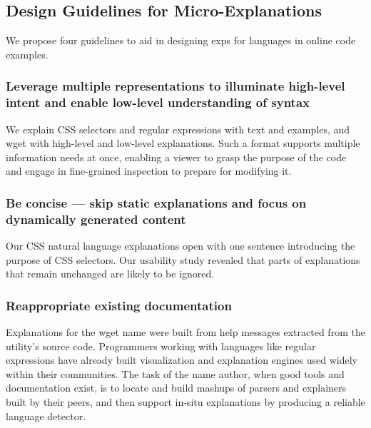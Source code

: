 \begin{changes}
\subsection{Design Guidelines for Micro-Explanations}
We propose four guidelines to aid in designing \glspl{exp} for languages in online code examples.

\subsubsection{Leverage multiple representations to illuminate high-level intent and enable low-level understanding of syntax}
We explain CSS selectors and regular expressions with text and examples, and wget with high-level and low-level explanations.
Such a format supports multiple information needs at once, enabling a viewer to grasp the purpose of the code and engage in fine-grained inspection to prepare for modifying it.

\subsubsection{Be concise --- skip static explanations and focus on dynamically generated content}
Our CSS natural language explanations open with one sentence introducing the purpose of CSS selectors.
Our usability study revealed that parts of explanations that remain unchanged are likely to be ignored. %

\subsubsection{Reappropriate existing documentation}
Explanations for the wget \Gls{name} were built from help messages extracted from the utility's source code.
Programmers working with languages like regular expressions have already built visualization and explanation engines used widely within their communities.
The task of the \Gls{name} author, when good tools and documentation exist, is to locate and build mashups of parsers and explainers built by their peers, and then support in-situ explanations by producing a reliable language detector.


\end{changes}
